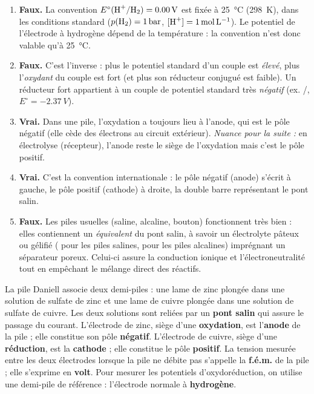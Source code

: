 \documentclass[11pt]{article}
\begin{document}
\begin{corrige}
\begin{enumerate}
\item \textbf{Faux.} La convention $E^{\circ}(\ce{H+}/\ce{H2}) = \SI{0,00}{V}$ est fixée à \SI{25}{\celsius} (\SI{298}{K}), dans les conditions standard ($p(\ce{H2}) = \SI{1}{bar}$, $[\ce{H+}] = \SI{1}{mol.L^{-1}}$). Le potentiel de l'électrode à hydrogène dépend de la température : la convention n'est donc valable qu'à \SI{25}{\celsius}.
\item \textbf{Faux.} C'est l'inverse : plus le potentiel standard d'un couple est \emph{élevé}, plus l'\emph{oxydant} du couple est fort (et plus son réducteur conjugué est faible). Un réducteur fort appartient à un couple de potentiel standard très \emph{négatif} (ex. /, $E^{\circ} = \SI{-2,37}{V}$).
\item \textbf{Vrai.} Dans une pile, l'oxydation a toujours lieu à l'anode, qui est le pôle négatif (elle cède des électrons au circuit extérieur). \emph{Nuance pour la suite :} en électrolyse (récepteur), l'anode reste le siège de l'oxydation mais c'est le pôle positif.
\item \textbf{Vrai.} C'est la convention internationale : le pôle négatif (anode) s'écrit à gauche, le pôle positif (cathode) à droite, la double barre représentant le pont salin.
\item \textbf{Faux.} Les piles usuelles (saline, alcaline, bouton) fonctionnent très bien : elles contiennent un \emph{équivalent} du pont salin, à savoir un électrolyte pâteux ou gélifié ( pour les piles salines,  pour les piles alcalines) imprégnant un séparateur poreux. Celui-ci assure la conduction ionique et l'électroneutralité tout en empêchant le mélange direct des réactifs.
\end{enumerate}
\end{corrige}

\begin{corrige}
La pile Daniell associe deux demi-piles : une lame de zinc plongée dans une solution de sulfate de zinc et une lame de cuivre plongée dans une solution de sulfate de cuivre. Les deux solutions sont reliées par un \textbf{pont salin} qui assure le passage du courant. L'électrode de zinc, siège d'une \textbf{oxydation}, est l'\textbf{anode} de la pile ; elle constitue son pôle \textbf{négatif}. L'électrode de cuivre, siège d'une \textbf{réduction}, est la \textbf{cathode} ; elle constitue le pôle \textbf{positif}. La tension mesurée entre les deux électrodes lorsque la pile ne débite pas s'appelle la \textbf{f.é.m.} de la pile ; elle s'exprime en \textbf{volt}. Pour mesurer les potentiels d'oxydoréduction, on utilise une demi-pile de référence : l'électrode normale à \textbf{hydrogène}.
\end{corrige}
\end{document}
